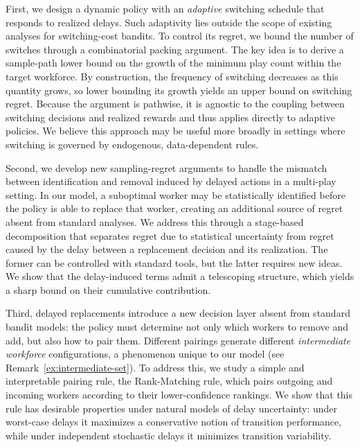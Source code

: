 \documentclass[opre,blindrev]{informs3}
\begin{document}
First, we design a dynamic policy with an \emph{adaptive} switching schedule that responds to realized delays. Such adaptivity lies outside the scope of existing analyses for switching-cost bandits. To control its regret, we bound the number of switches through a combinatorial packing argument. The key idea is to derive a sample-path lower bound on the growth of the minimum play count within the target workforce. By construction, the frequency of switching decreases as this quantity grows, so lower bounding its growth yields an upper bound on switching regret. Because the argument is pathwise, it is agnostic to the coupling between switching decisions and realized rewards and thus applies directly to adaptive policies. We believe this approach may be useful more broadly in settings where switching is governed by endogenous, data-dependent rules.

Second, we develop new sampling-regret arguments to handle the mismatch between identification and removal induced by delayed actions in a multi-play setting. In our model, a suboptimal worker may be statistically identified before the policy is able to replace that worker, creating an additional source of regret absent from standard analyses. We address this through a stage-based decomposition that separates regret due to statistical uncertainty from regret caused by the delay between a replacement decision and its realization. The former can be controlled with standard tools, but the latter requires new ideas. We show that the delay-induced terms admit a telescoping structure, which yields a sharp bound on their cumulative contribution.

Third, delayed replacements introduce a new decision layer absent from standard bandit models: the policy must determine not only which workers to remove and add, but also how to pair them. Different pairings generate different \emph{intermediate workforce} configurations, a phenomenon unique to our model (see Remark~\ref{ex:intermediate-set}). To address this, we study a simple and interpretable pairing rule, the Rank-Matching rule, which pairs outgoing and incoming workers according to their lower-confidence rankings. We show that this rule has desirable properties under natural models of delay uncertainty: under worst-case delays it maximizes a conservative notion of transition performance, while under independent stochastic delays it minimizes transition variability.
\end{document}

